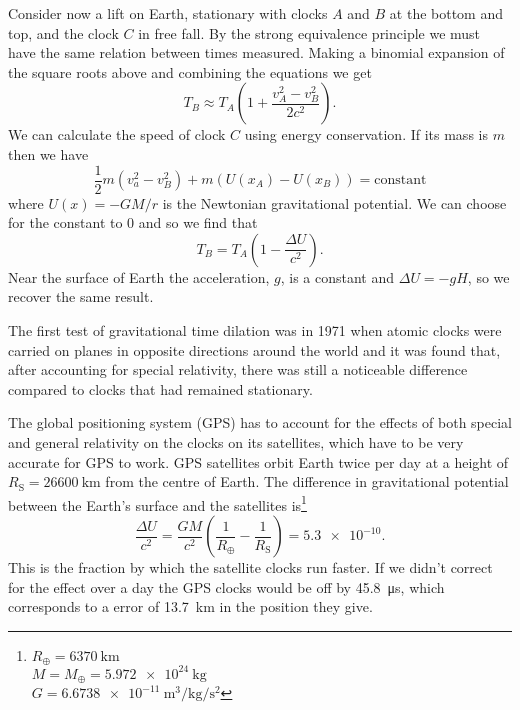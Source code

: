 \documentclass[fleqn]{NotesClass}
\begin{document}
    Consider now a lift on Earth, stationary with clocks \(A\) and \(B\) at the bottom and top, and the clock \(C\) in free fall.
    By the strong equivalence principle we must have the same relation between times measured.
    Making a binomial expansion of the square roots above and combining the equations we get
    \begin{equation}
        T_B \approx T_A \left( 1 + \frac{v_A^2 - v_B^2}{2c^2} \right).
    \end{equation}
    We can calculate the speed of clock \(C\) using energy conservation.
    If its mass is \(m\) then we have
    \begin{equation}
        \frac{1}{2}m(v_a^2 - v_B^2) + m(U(x_A) - U(x_B)) = \text{constant}
    \end{equation}
    where \(U(x) = -GM/r\) is the Newtonian gravitational potential.
    We can choose for the constant to 0 and so we find that
    \begin{equation}
        T_B = T_A \left( 1 - \frac{\Delta U}{c^2} \right).
    \end{equation}
    Near the surface of Earth the acceleration, \(g\), is a constant and \(\Delta U = -gH\), so we recover the same result.
    
    The first test of gravitational time dilation was in 1971 when atomic clocks were carried on planes in opposite directions around the world and it was found that, after accounting for special relativity, there was still a noticeable difference compared to clocks that had remained stationary.
    
    The global positioning system (GPS) has to account for the effects of both special and general relativity on the clocks on its satellites, which have to be very accurate for GPS to work.
    GPS satellites orbit Earth twice per day at a height of \(R_{\mathrm{S}} = \qty{26600}{\kilo\metre}\) from the centre of Earth.
    The difference in gravitational potential between the Earth's surface and the satellites is\footnote{\(R_{\oplus} = \qty{6370}{\kilo\metre}\)\\\(M = M_{\oplus} = \qty{5.972e24}{\kilogram}\)\\\(G = \qty{6.6738e-11}{\metre\cubed\per\kilogram\per\second\squared}\)}
    \begin{equation}
        \frac{\Delta U}{c^2} = \frac{GM}{c^2} \left( \frac{1}{R_{\oplus}} - \frac{1}{R_{\mathrm{S}}} \right) = \num{5.3e-10}.
    \end{equation}
    This is the fraction by which the satellite clocks run faster.
    If we didn't correct for the effect over a day the GPS clocks would be off by \qty{45.8}{\micro\second}, which corresponds to a error of \qty{13.7}{\kilo\metre} in the position they give.
    
\end{document}

